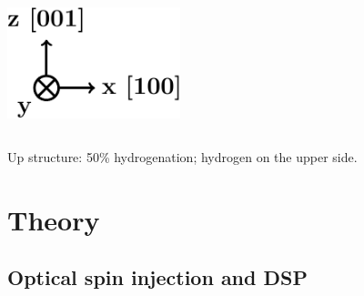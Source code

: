 \documentclass{beamer}
\begin{document}
\begin{frame}
\begin{columns}
\vspace{5mm}

\flushleft
\includegraphics[width=0.9\textwidth]{figs/arrows2.pdf}

\end{columns}

\vspace{-4mm}
\begin{center}
{\Large Up structure:} 50\% hydrogenation; hydrogen on the upper side.
\end{center}

\end{frame}







\section{Theory} 



\subsection{Optical spin injection and DSP}
\end{document}
